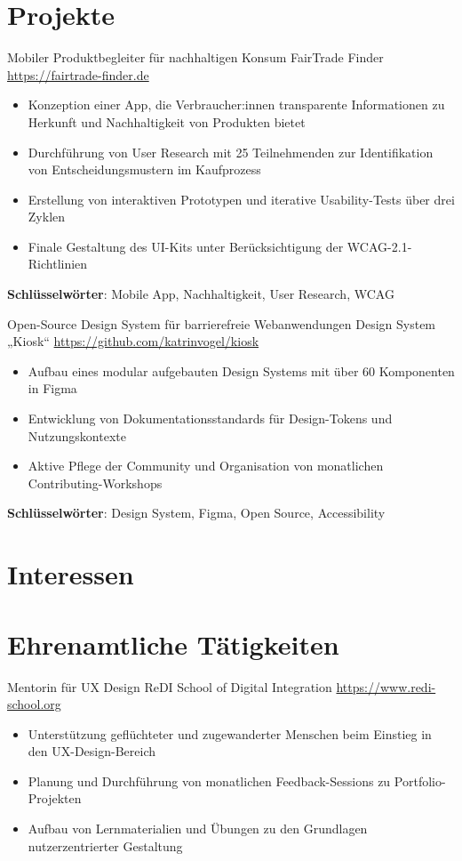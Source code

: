 \documentclass[a4paper, serif, 10pt]{moderncv}
\begin{document}
\section{Projekte}

        {Mobiler Produktbegleiter für nachhaltigen Konsum}
        {FairTrade Finder}
        {\url{https://fairtrade-finder.de}}
        {}
        {\begin{itemize}
\item Konzeption einer App, die Verbraucher:innen transparente Informationen zu Herkunft und Nachhaltigkeit von Produkten bietet
\item Durchführung von User Research mit 25 Teilnehmenden zur Identifikation von Entscheidungsmustern im Kaufprozess
\item Erstellung von interaktiven Prototypen und iterative Usability-Tests über drei Zyklen
\item Finale Gestaltung des UI-Kits unter Berücksichtigung der WCAG-2.1-Richtlinien
\end{itemize}
\textbf{Schlüsselwörter}: Mobile App, Nachhaltigkeit, User Research, WCAG}

        {Open-Source Design System für barrierefreie Webanwendungen}
        {Design System „Kiosk“}
        {\url{https://github.com/katrinvogel/kiosk}}
        {}
        {\begin{itemize}
\item Aufbau eines modular aufgebauten Design Systems mit über 60 Komponenten in Figma
\item Entwicklung von Dokumentationsstandards für Design-Tokens und Nutzungskontexte
\item Aktive Pflege der Community und Organisation von monatlichen Contributing-Workshops
\end{itemize}
\textbf{Schlüsselwörter}: Design System, Figma, Open Source, Accessibility}
\section{Interessen}

\section{Ehrenamtliche Tätigkeiten}

        {Mentorin für UX Design}
        {ReDI School of Digital Integration}
        {\url{https://www.redi-school.org}}
        {}
        {\begin{itemize}
\item Unterstützung geflüchteter und zugewanderter Menschen beim Einstieg in den UX-Design-Bereich
\item Planung und Durchführung von monatlichen Feedback-Sessions zu Portfolio-Projekten
\item Aufbau von Lernmaterialien und Übungen zu den Grundlagen nutzerzentrierter Gestaltung
\end{itemize}}
    
\end{document}
